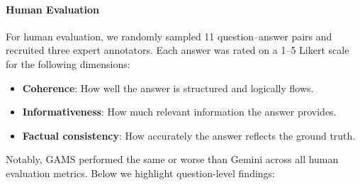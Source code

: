 \documentclass[fleqn,moreauthors,10pt]{ds_report}
\begin{document}
\paragraph{Human Evaluation}
For human evaluation, we randomly sampled 11 question--answer pairs and recruited three expert annotators. Each answer was rated on a 1--5 Likert scale for the following dimensions:
\begin{itemize}
  \item \textbf{Coherence}: How well the answer is structured and logically flows.
  \item \textbf{Informativeness}: How much relevant information the answer provides.
  \item \textbf{Factual consistency}: How accurately the answer reflects the ground truth.
\end{itemize}
\clearpage
Notably, GAMS performed the same or worse than Gemini across all human evaluation metrics. Below we highlight question-level findings:
\end{document}
